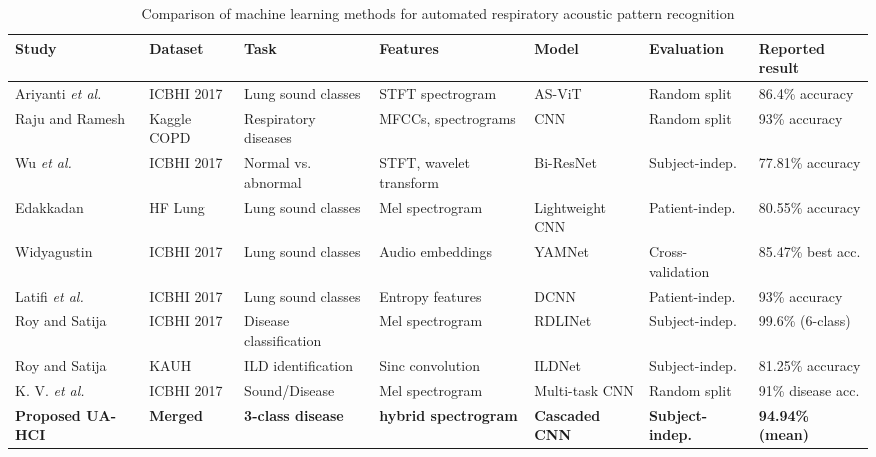 \begin{table}[!t]
\centering
\caption{Comparison of machine learning methods for automated respiratory acoustic pattern recognition}
\label{tab:ml_comparison}
\footnotesize
\setlength{\tabcolsep}{3pt}
\renewcommand{\arraystretch}{1.12}
\begin{tabularx}{\textwidth}{@{}p{2.2cm}p{1.8cm}p{1.8cm}p{2.3cm}p{2.0cm}p{2.0cm}X@{}}
\toprule
\textbf{Study} & \textbf{Dataset} & \textbf{Task} & \textbf{Features} & \textbf{Model} & \textbf{Evaluation} & \textbf{Reported result} \\
\midrule
Ariyanti \textit{et al.} \cite{b07} & ICBHI 2017 & Lung sound classes & STFT spectrogram & AS-ViT & Random split & 86.4\% accuracy \\
Raju and Ramesh \cite{b08} & Kaggle COPD & Respiratory diseases & MFCCs, spectrograms & CNN & Random split & 93\% accuracy \\
Wu \textit{et al.} \cite{b09} & ICBHI 2017 & Normal vs. abnormal & STFT, wavelet transform & Bi-ResNet & Subject-indep. & 77.81\% accuracy \\
Edakkadan \cite{b10} & HF Lung & Lung sound classes & Mel spectrogram & Lightweight CNN & Patient-indep. & 80.55\% accuracy \\
Widyagustin \cite{b11} & ICBHI 2017 & Lung sound classes & Audio embeddings & YAMNet & Cross-validation & 85.47\% best acc. \\
Latifi \textit{et al.} \cite{b12} & ICBHI 2017 & Lung sound classes & Entropy features & DCNN & Patient-indep. & 93\% accuracy \\
Roy and Satija \cite{b13} & ICBHI 2017 & Disease classification & Mel spectrogram & RDLINet & Subject-indep. & 99.6\% (6-class) \\
Roy and Satija \cite{b14} & KAUH & ILD identification & Sinc convolution & ILDNet & Subject-indep. & 81.25\% accuracy \\
K. V. \textit{et al.} \cite{b15} & ICBHI 2017 & Sound/Disease & Mel spectrogram & Multi-task CNN & Random split & 91\% disease acc. \\
\midrule
\textbf{Proposed UA-HCI} & \textbf{Merged} & \textbf{3-class disease} & \textbf{hybrid spectrogram} & \textbf{Cascaded CNN} & \textbf{Subject-indep.} & \textbf{94.94\% (mean)} \\
\bottomrule
\end{tabularx}
\end{table}
